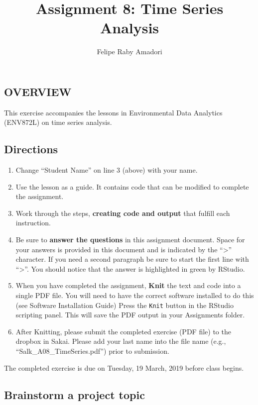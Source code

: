 \documentclass[]{article}
\title{Assignment 8: Time Series Analysis}
\author{Felipe Raby Amadori}
\date{}
\providecommand{\tightlist}{%
  \setlength{\itemsep}{0pt}\setlength{\parskip}{0pt}}
\begin{document}
\maketitle

\subsection{OVERVIEW}\label{overview}

This exercise accompanies the lessons in Environmental Data Analytics
(ENV872L) on time series analysis.

\subsection{Directions}\label{directions}

\begin{enumerate}
\def\labelenumi{\arabic{enumi}.}
\tightlist
\item
  Change ``Student Name'' on line 3 (above) with your name.
\item
  Use the lesson as a guide. It contains code that can be modified to
  complete the assignment.
\item
  Work through the steps, \textbf{creating code and output} that fulfill
  each instruction.
\item
  Be sure to \textbf{answer the questions} in this assignment document.
  Space for your answers is provided in this document and is indicated
  by the ``\textgreater{}'' character. If you need a second paragraph be
  sure to start the first line with ``\textgreater{}''. You should
  notice that the answer is highlighted in green by RStudio.
\item
  When you have completed the assignment, \textbf{Knit} the text and
  code into a single PDF file. You will need to have the correct
  software installed to do this (see Software Installation Guide) Press
  the \texttt{Knit} button in the RStudio scripting panel. This will
  save the PDF output in your Assignments folder.
\item
  After Knitting, please submit the completed exercise (PDF file) to the
  dropbox in Sakai. Please add your last name into the file name (e.g.,
  ``Salk\_A08\_TimeSeries.pdf'') prior to submission.
\end{enumerate}

The completed exercise is due on Tuesday, 19 March, 2019 before class
begins.

\subsection{Brainstorm a project
topic}\label{brainstorm-a-project-topic}
\end{document}
